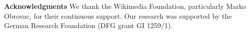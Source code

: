 \noindent\textbf{Acknowledgments} We thank the Wikimedia Foundation, particularly Marko Obrovac, for their continuous support. Our research was supported by the German Research Foundation (DFG grant GI 1259/1).

